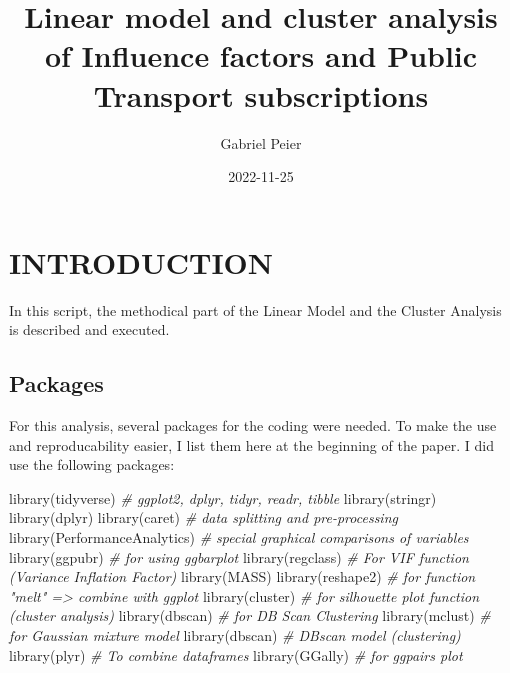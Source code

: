 \documentclass[
]{article}
\title{Linear model and cluster analysis of Influence factors and Public
Transport subscriptions}
\author{Gabriel Peier}
\date{2022-11-25}
\newenvironment{Shaded}{\begin{snugshade}}{\end{snugshade}}
\newcommand{\CommentTok}[1]{\textcolor[rgb]{0.56,0.35,0.01}{\textit{#1}}}
\newcommand{\FunctionTok}[1]{\textcolor[rgb]{0.00,0.00,0.00}{#1}}
\newcommand{\NormalTok}[1]{#1}
\begin{document}
\maketitle

\graphicspath{ {G:/My Drive/MasterThesis/Scripts/Outputs}}

\hypertarget{introduction}{%
\section{INTRODUCTION}\label{introduction}}

In this script, the methodical part of the Linear Model and the Cluster
Analysis is described and executed.

\hypertarget{packages}{%
\subsection{Packages}\label{packages}}

For this analysis, several packages for the coding were needed. To make
the use and reproducability easier, I list them here at the beginning of
the paper. I did use the following packages:

\begin{Shaded}
\begin{Highlighting}[]
\FunctionTok{library}\NormalTok{(tidyverse)             }\CommentTok{\# ggplot2, dplyr, tidyr, readr, tibble}
\FunctionTok{library}\NormalTok{(stringr)}
\FunctionTok{library}\NormalTok{(dplyr)}
\FunctionTok{library}\NormalTok{(caret)                 }\CommentTok{\# data splitting and pre{-}processing}
\FunctionTok{library}\NormalTok{(PerformanceAnalytics)  }\CommentTok{\# special graphical comparisons of variables}
\FunctionTok{library}\NormalTok{(ggpubr)                }\CommentTok{\# for using ggbarplot}
\FunctionTok{library}\NormalTok{(regclass)              }\CommentTok{\# For VIF function (Variance Inflation Factor)}
\FunctionTok{library}\NormalTok{(MASS)}
\FunctionTok{library}\NormalTok{(reshape2)              }\CommentTok{\# for function "melt" =\textgreater{} combine with ggplot}
\FunctionTok{library}\NormalTok{(cluster)               }\CommentTok{\# for silhouette plot function (cluster analysis)}
\FunctionTok{library}\NormalTok{(dbscan)                }\CommentTok{\# for DB Scan Clustering}
\FunctionTok{library}\NormalTok{(mclust)                }\CommentTok{\# for Gaussian mixture model}
\FunctionTok{library}\NormalTok{(dbscan)                }\CommentTok{\# DBscan model (clustering)}
\FunctionTok{library}\NormalTok{(plyr)                  }\CommentTok{\# To combine dataframes}
\FunctionTok{library}\NormalTok{(GGally)                }\CommentTok{\# for ggpairs plot}
\end{Highlighting}
\end{Shaded}
\end{document}
